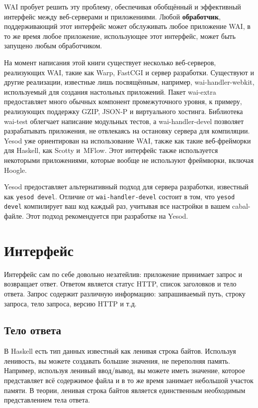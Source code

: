 WAI пробует решить эту проблему, обеспечивая обобщённый и эффективный интерфейс
между веб-серверами и приложениями. Любой \textbf{обработчик}, поддерживающий
этот интерфейс может обслуживать любое приложение WAI, в то же время любое
приложение, использующее этот интерфейс, может быть запущено любым
обработчиком.

На момент написания этой книги существует несколько веб-серверов, реализующих
WAI, такие как Warp, FastCGI и сервер разработки. Существуют и другие
реализации, известные лишь посвящённым, например, wai-handler-webkit,
используемый для создания настольных приложений. Пакет wai-extra предоставляет
много обычных компонент промежуточного уровня, к примеру, реализующих поддержку
GZIP, JSON-P и виртуального хостинга. Библиотека wai-test облегчает написание
модульных тестов, а wai-handler-devel позволяет разрабатывать приложения, не
отвлекаясь на остановку сервера для компиляции.  Yesod уже ориентирован на
использование WAI, также как такие веб-фрейморки для Haskell, как Scotty
и~MFlow. Этот интерфейс также используется некоторыми приложениями, которые
вообще не используют фреймворки, включая Hoogle.

\begin{remark}
    Yesod предоставляет альтернативный подход для сервера разработки, известный
    как \texttt{yesod devel}. Отличие от \texttt{wai-handler-devel} состоит в
    том, что \texttt{yesod devel} компилирует ваш код каждый раз, учитывая все
    настройки в вашем cabal-файле.  Этот подход рекомендуется при разработке на
    Yesod.
\end{remark}

\section {Интерфейс}
Интерфейс сам по себе довольно незатейлив: приложение принимает запрос и
возвращает ответ. Ответом является статус HTTP, список заголовков и тело
ответа.  Запрос содержит различную информацию: запрашиваемый путь, строку
запроса, тело запроса, версию HTTP и т.д.

\subsection {Тело ответа}
В Haskell есть тип данных известный как ленивая строка байтов. Используя
ленивость, вы можете создавать большие значения, не переполняя память.
Например, используя ленивый ввод/вывод, вы можете иметь значение, которое
представляет всё содержимое файла и в то же время занимает небольшой участок
памяти. В теории, ленивая строка байтов является единственным необходимым
представлением тела ответа.

